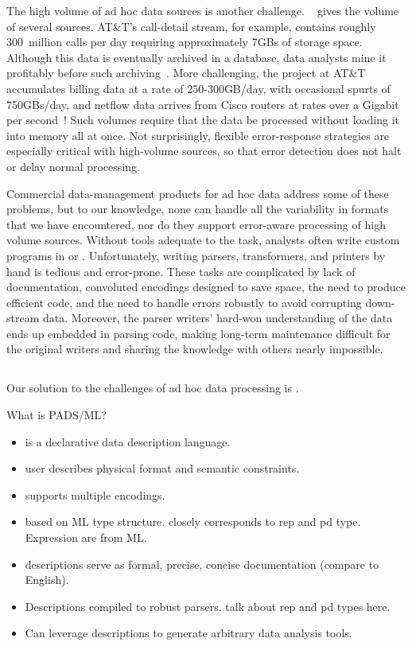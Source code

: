The high volume of ad hoc data sources is another challenge.
~ gives the volume of several sources.
AT\&T's call-detail stream, for example, contains roughly 300~million
calls per day requiring approximately 7GBs of storage space.  Although
this data is eventually archived in a database, data analysts mine it
profitably before such archiving~\cite{kdd98,kdd99}.  More
challenging, the \ningaui{} project at AT\&T accumulates billing data
at a rate of 250-300GB/day, with occasional spurts of 750GBs/day, and
netflow data arrives from Cisco routers at rates over a Gigabit per
second~\cite{gigascope}!  Such volumes require that the data be
processed without loading it into memory all at once.  Not
surprisingly, flexible error-response strategies are especially
critical with high-volume sources, so that error detection does not
halt or delay normal processing.


Commercial data-management products for ad hoc data address 
some of these problems, but to our knowledge, none can handle all the variability
in formats that we have encountered, nor do they support error-aware
processing of high volume sources.  Without tools adequate to the
task, analysts often write custom programs in \C{} or \perl{}.
Unfortunately, writing parsers, transformers, and printers by hand is
tedious and error-prone.  These tasks are complicated by lack of
documentation, convoluted encodings designed to save space, the need
to produce efficient code, and the need to handle errors robustly to
avoid corrupting down-stream data.  Moreover, the parser writers'
hard-won understanding of the data ends up embedded in parsing code,
making long-term maintenance difficult for the original writers and
sharing the knowledge with others nearly impossible.

\subsection{\padsmlbig{}}

Our solution to the challenges of ad hoc data processing is
\padsml{}. 

What is PADS/ML?
\begin{itemize}
\item \padsml{} is a declarative data description language.
\item user describes physical format and semantic constraints.
\item supports multiple encodings.
\item based on ML type structure. closely corresponds to rep and pd
  type. Expression are from ML.
\item descriptions serve as formal, precise, concise documentation
  (compare to English).
\item Descriptions compiled to robust parsers. talk about rep and pd
  types here.
\item Can leverage descriptions to generate arbitrary data analysis tools.
\end{itemize}

